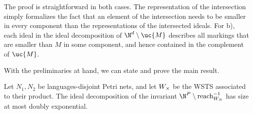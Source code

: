 \documentclass[../../diss.tex]{subfiles}
\begin{document}
The proof is straightforward in both cases.
The representation of the intersection simply formalizes the fact that an element of the intersection needs to be smaller in every component than the representations of the intersected ideals.
For b), each ideal in the ideal decomposition of $\N^d \setminus \uc{M}$ describes all markings that are smaller than $M$ in some component, and hence contained in the complement of $\uc{M}$.

With the preliminaries at hand, we can state and prove the main result.

\begin{proposition}%
\label{Proposition:PNSeparabilityUpperBound}%
    Let $N_1,N_2$ be languages-disjoint Petri nets, and let $W_{\times}$ be the WSTS associated to their product.
    The ideal decomposition of the invariant $\N^P \setminus \reachrev{\wstsN}$ has size at most doubly exponential.
\end{proposition}
\end{document}
